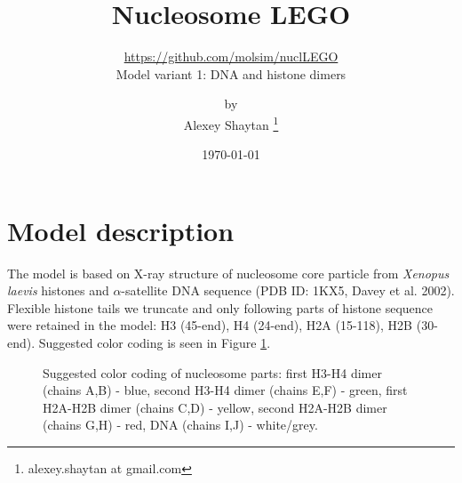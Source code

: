 \documentclass[12pt,onecolumn]{scrartcl}
\title{Nucleosome LEGO} %
\subtitle{\url{https://github.com/molsim/nuclLEGO} \\ Model variant 1: DNA and histone dimers }
\author{by \\ Alexey Shaytan \footnote{alexey.shaytan at gmail.com}} %
\date{\small{\today}} %
\begin{document}
\maketitle %




\section{Model description}
The model is based on X-ray structure of nucleosome core particle from \textit{Xenopus laevis} histones and $\alpha$-satellite DNA sequence (PDB ID: 1KX5, Davey et al. 2002). Flexible histone tails we truncate and only following parts of histone sequence were retained in the model: H3 (45-end), H4 (24-end), H2A (15-118), H2B (30-end). Suggested color coding is seen in Figure \ref{colorcode}.

\begin{figure}[h]
\begin{center}
\caption{Suggested color coding of nucleosome parts: first H3-H4 dimer (chains A,B) - blue, second H3-H4 dimer (chains E,F) - green, first H2A-H2B dimer (chains C,D) - yellow, second H2A-H2B dimer (chains G,H) - red, DNA (chains I,J) - white/grey.}
\label{colorcode}
\end{center}
\end{figure}
\end{document}
